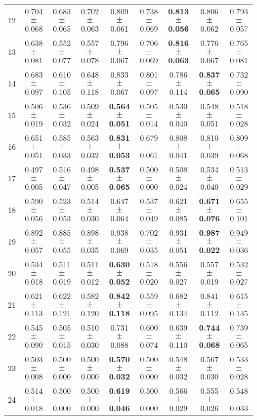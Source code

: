 \begin{table}[!ht]
{\begin{tabular}{r c c c c c c c c}
12 & 0.704 $\pm$ 0.068 & 0.683 $\pm$ 0.065 & 0.702 $\pm$ 0.063 & 0.809 $\pm$ 0.061 & 0.738 $\pm$ 0.069 & \textbf{0.813 $\pm$ 0.056} & 0.806 $\pm$ 0.062 & 0.793 $\pm$ 0.057 \\
13 & 0.638 $\pm$ 0.081 & 0.552 $\pm$ 0.077 & 0.557 $\pm$ 0.078 & 0.796 $\pm$ 0.067 & 0.706 $\pm$ 0.069 & \textbf{0.816 $\pm$ 0.063} & 0.776 $\pm$ 0.067 & 0.765 $\pm$ 0.081 \\
14 & 0.683 $\pm$ 0.097 & 0.610 $\pm$ 0.105 & 0.648 $\pm$ 0.118 & 0.833 $\pm$ 0.067 & 0.801 $\pm$ 0.097 & 0.786 $\pm$ 0.114 & \textbf{0.837 $\pm$ 0.065} & 0.732 $\pm$ 0.090 \\
15 & 0.506 $\pm$ 0.019 & 0.536 $\pm$ 0.032 & 0.509 $\pm$ 0.024 & \textbf{0.564 $\pm$ 0.051} & 0.505 $\pm$ 0.014 & 0.530 $\pm$ 0.040 & 0.548 $\pm$ 0.051 & 0.518 $\pm$ 0.028 \\
16 & 0.651 $\pm$ 0.051 & 0.585 $\pm$ 0.033 & 0.563 $\pm$ 0.032 & \textbf{0.831 $\pm$ 0.053} & 0.679 $\pm$ 0.061 & 0.808 $\pm$ 0.041 & 0.810 $\pm$ 0.039 & 0.809 $\pm$ 0.068 \\
17 & 0.497 $\pm$ 0.005 & 0.516 $\pm$ 0.047 & 0.498 $\pm$ 0.005 & \textbf{0.537 $\pm$ 0.065} & 0.500 $\pm$ 0.000 & 0.508 $\pm$ 0.024 & 0.534 $\pm$ 0.040 & 0.513 $\pm$ 0.029 \\
18 & 0.590 $\pm$ 0.056 & 0.523 $\pm$ 0.053 & 0.514 $\pm$ 0.030 & 0.647 $\pm$ 0.064 & 0.537 $\pm$ 0.049 & 0.621 $\pm$ 0.085 & \textbf{0.671 $\pm$ 0.076} & 0.655 $\pm$ 0.101 \\
19 & 0.892 $\pm$ 0.057 & 0.885 $\pm$ 0.055 & 0.898 $\pm$ 0.035 & 0.938 $\pm$ 0.069 & 0.702 $\pm$ 0.035 & 0.931 $\pm$ 0.051 & \textbf{0.987 $\pm$ 0.022} & 0.949 $\pm$ 0.036 \\
20 & 0.534 $\pm$ 0.018 & 0.511 $\pm$ 0.019 & 0.511 $\pm$ 0.012 & \textbf{0.630 $\pm$ 0.052} & 0.518 $\pm$ 0.020 & 0.556 $\pm$ 0.027 & 0.557 $\pm$ 0.019 & 0.532 $\pm$ 0.027 \\
21 & 0.621 $\pm$ 0.113 & 0.622 $\pm$ 0.121 & 0.582 $\pm$ 0.120 & \textbf{0.842 $\pm$ 0.118} & 0.559 $\pm$ 0.095 & 0.682 $\pm$ 0.134 & 0.841 $\pm$ 0.112 & 0.615 $\pm$ 0.135 \\
22 & 0.545 $\pm$ 0.090 & 0.505 $\pm$ 0.015 & 0.510 $\pm$ 0.030 & 0.731 $\pm$ 0.088 & 0.600 $\pm$ 0.074 & 0.639 $\pm$ 0.110 & \textbf{0.744 $\pm$ 0.068} & 0.739 $\pm$ 0.065 \\
23 & 0.503 $\pm$ 0.008 & 0.500 $\pm$ 0.000 & 0.500 $\pm$ 0.000 & \textbf{0.570 $\pm$ 0.032} & 0.500 $\pm$ 0.000 & 0.548 $\pm$ 0.032 & 0.567 $\pm$ 0.030 & 0.533 $\pm$ 0.028 \\
24 & 0.514 $\pm$ 0.018 & 0.500 $\pm$ 0.000 & 0.500 $\pm$ 0.000 & \textbf{0.619 $\pm$ 0.046} & 0.500 $\pm$ 0.000 & 0.566 $\pm$ 0.029 & 0.555 $\pm$ 0.026 & 0.548 $\pm$ 0.033 \\

\end{tabular}}
\end{table}
